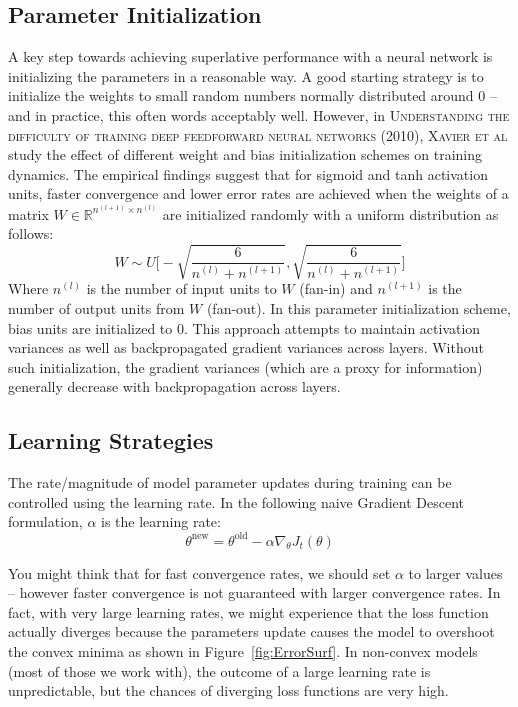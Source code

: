 \documentclass{tufte-handout}
\begin{document}
{\subsection{Parameter Initialization}

A key step towards achieving superlative performance with a neural network is initializing the parameters in a reasonable way.  A good starting strategy is to initialize the weights to small random numbers normally distributed around $0$ -- and in practice, this often words acceptably well.
However, in \textsc{Understanding the difficulty of training deep feedforward neural networks (2010), Xavier et al} study the effect of different weight and bias initialization schemes on training dynamics. The empirical findings suggest that for sigmoid and tanh activation units, faster convergence and lower error rates are achieved when the weights of a matrix $W \in \mathbb{R}^{n^{(l+1)}\times n^{(l)}}$ are initialized randomly with a uniform distribution as follows:
$$W \sim U\bigg[-\sqrt{\frac{6}{n^{(l)} + n^{(l+1)}}}, \sqrt{\frac{6}{n^{(l)} + n^{(l+1)}}}\bigg]$$
Where $n^{(l)}$ is the number of input units to $W$ (fan-in) and  $n^{(l+1)}$ is the number of output units from $W$ (fan-out).
In this parameter initialization scheme, bias units are initialized to $0$. This approach attempts to maintain activation variances as well as backpropagated gradient variances across layers. Without such initialization, the gradient variances (which are a proxy for information) generally decrease with backpropagation across layers.
\subsection{Learning Strategies}
The rate/magnitude of model parameter updates during training can be controlled using the learning rate. In the following naive Gradient Descent formulation, $\alpha$ is the learning rate:
$$ \theta^{\text{new}} = \theta^{\text{old}} - \alpha \nabla_{\theta}J_t(\theta)$$

You might think that for fast convergence rates, we should set $\alpha$ to larger values -- however faster convergence is not guaranteed with larger convergence rates. In fact, with very large learning rates, we might experience that the loss function actually diverges because the parameters update causes the model to overshoot the convex minima as shown in Figure~\ref{fig:ErrorSurf}. In non-convex models (most of those we work with), the outcome of a large learning rate is unpredictable, but the chances of diverging loss functions are very high.


}
\end{document}
